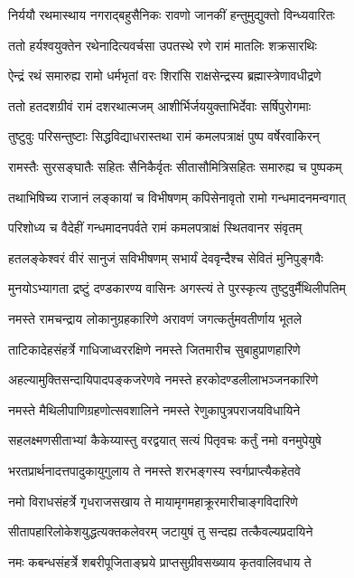 \twolineshloka
{निर्ययौ रथमास्थाय नगराद्बहुसैनिकः}
{रावणो जानकीं हन्तुमुद्युक्तो विन्ध्यवारितः}%

\twolineshloka
{ततो हर्यश्वयुक्तेन रथेनादित्यवर्चसा}
{उपतस्थे रणे रामं मातलिः शक्रसारथिः}%

\twolineshloka
{ऐन्द्रं रथं समारुह्य रामो धर्मभृतां वरः}
{शिरांसि राक्षसेन्द्रस्य ब्रह्मास्त्रेणावधीद्रणे}%

\twolineshloka
{ततो हतदशग्रीवं रामं दशरथात्मजम्}
{आशीर्भिर्जययुक्ताभिर्देवाः सर्षिपुरोगमाः}%

\twolineshloka
{तुष्टुवुः परिसन्तुष्टाः सिद्धविद्याधरास्तथा}
{रामं कमलपत्राक्षं पुष्प वर्षेरवाकिरन्}%

\twolineshloka
{रामस्तैः सुरसङ्घातैः सहितः सैनिकैर्वृतः}
{सीतासौमित्रिसहितः समारुह्य च पुष्पकम्}%

\twolineshloka
{तथाभिषिच्य राजानं लङ्कायां च विभीषणम्}
{कपिसेनावृतो रामो गन्धमादनमन्वगात्}%

\twolineshloka
{परिशोध्य च वैदेहीं गन्धमादनपर्वते}
{रामं कमलपत्राक्षं स्थितवानर संवृतम्}%

\twolineshloka
{हतलङ्केश्वरं वीरं सानुजं सविभीषणम्}
{सभार्यं देववृन्दैश्च सेवितं मुनिपुङ्गवैः}%

\twolineshloka
{मुनयोऽभ्यागता द्रष्टुं दण्डकारण्य वासिनः}
{अगस्त्यं ते पुरस्कृत्य तुष्टुवुर्मैथिलीपतिम्}%


\twolineshloka
{नमस्ते रामचन्द्राय लोकानुग्रहकारिणे}
{अरावणं जगत्कर्तुमवतीर्णाय भूतले}%

\twolineshloka
{ताटिकादेहसंहर्त्रे गाधिजाध्वररक्षिणे}
{नमस्ते जितमारीच सुबाहुप्राणहारिणे}%

\twolineshloka
{अहल्यामुक्तिसन्दायिपादपङ्कजरेणवे}
{नमस्ते हरकोदण्डलीलाभञ्जनकारिणे}%

\twolineshloka
{नमस्ते मैथिलीपाणिग्रहणोत्सवशालिने}
{नमस्ते रेणुकापुत्रपराजयविधायिने}%

\twolineshloka
{सहलक्ष्मणसीताभ्यां कैकेय्यास्तु वरद्वयात्}
{सत्यं पितृवचः कर्तुं नमो वनमुपेयुषे}%

\twolineshloka
{भरतप्रार्थनादत्तपादुकायुगुलाय ते}
{नमस्ते शरभङ्गस्य स्वर्गप्राप्त्यैकहेतवे}%

\twolineshloka
{नमो विराधसंहर्त्रे गृधराजसखाय ते}
{मायामृगमहाक्रूरमारीचाङ्गविदारिणे}%

\twolineshloka
{सीतापहारिलोकेशयुद्धत्यक्तकलेवरम्}
{जटायुषं तु सन्दह्य तत्कैवल्यप्रदायिने}%

\twolineshloka
{नमः कबन्धसंहर्त्रे शबरीपूजिताङ्घ्रये}
{प्राप्तसुग्रीवसख्याय कृतवालिवधाय ते}%


